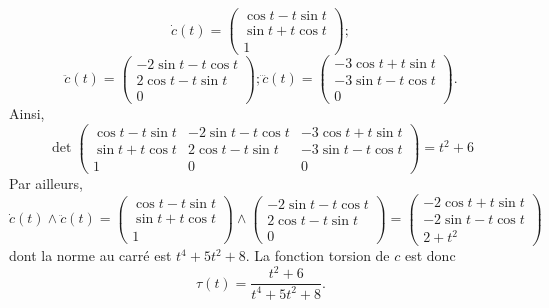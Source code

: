 {\begin{enumerate}
{$$ \dot{c}(t)=\left(\begin{array}{c}\cos t -t\sin t\\ \sin t + t\cos t\\ 1\end{array}\right) ;$$
 $$
 \ddot{c}(t)=\left(\begin{array}{c}-2\sin t -t\cos t\\ 2\cos t - t\sin t\\ 0\end{array}\right) ; 
 \dddot{c}(t)=\left(\begin{array}{c}-3\cos t +t\sin t\\ -3\sin t -t\cos t\\ 0\end{array}\right).$$
 Ainsi, $$\det\begin{pmatrix}
        \cos t -t\sin t &-2\sin t -t\cos t&-3\cos t +t\sin t\\
 \sin t + t\cos t&2\cos t - t\sin t&-3\sin t - t\cos t\\1&0&0
        \end{pmatrix}=t^2+6$$
 Par ailleurs,
 $$\dot{c}(t)\wedge\ddot{c}(t)=\left(\begin{array}{c}\cos t -t\sin t\\ \sin t + t\cos t\\ 1\end{array}\right) 
 \wedge\left(\begin{array}{c}-2\sin t -t\cos t\\ 2\cos t - t\sin t\\ 0\end{array}\right)=
 \begin{pmatrix}
 - 2\cos t +t\sin t\\-2\sin t -t\cos t\\2+t^2
 \end{pmatrix}
 $$ dont la norme au carré est $t^4+5t^2+8$.
 La fonction torsion de $c$ est donc $$\tau(t)=\frac{t^2+6}{t^4+5t^2+8}.$$}
\end{enumerate}
}
